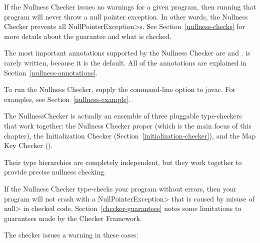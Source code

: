 
If the Nullness Checker issues no warnings for a given program, then
running that program will never throw a null pointer exception.  In
other words, the Nullness Checker prevents all \<NullPointerException>s.
See Section~\ref{nullness-checks} for more details about
the guarantee and what is checked.

The most important annotations supported by the Nullness Checker are
 and
.
 is rarely written, because it is
the default.  All of the annotations are explained in
Section~\ref{nullness-annotations}.

To run the Nullness Checker, supply the
command-line option to javac.  For
examples, see Section~\ref{nullness-example}.

\iffalse %
The NullnessChecker is actually an ensemble of four pluggable
type-checkers that work together: the Nullness Checker proper (which is the
main focus of this chapter), the Initialization Checker
(Section~\ref{initialization-checker}), the Map Key Checker
(\chapterpageref{map-key-checker}), and the Path Shape Checker
(\chapterpageref{path-shape-checker}).
\else
The NullnessChecker is actually an ensemble of three pluggable
type-checkers that work together: the Nullness Checker proper (which is the
main focus of this chapter), the Initialization Checker
(Section~\ref{initialization-checker}), and the Map Key Checker
().
\fi
Their type hierarchies are completely independent, but they work together
to provide precise nullness checking.




If the Nullness Checker type-checks your program without errors, then your
program will not crash with a \<NullPointerException> that is caused by
misuse of \<null> in checked code.
%
Section~\ref{checker-guarantees} notes some limitations to guarantees made
by the Checker Framework.

The checker issues a warning in these cases:

